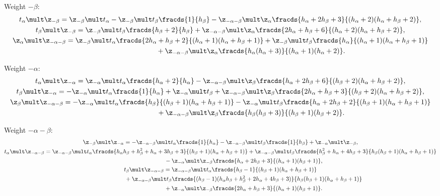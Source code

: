 \documentclass[pdftex]{sigma}
\def\a{\alpha}\def\Ar{{\rm A}}\def\Ab{\bar{\rm A}}\def\b{\beta}\def\bb{\mathfrak{b}}
\numberwithin{equation}{section}
\begin{document}
Weight $-\beta$:
\begin{gather}
 t_\a\mult \z_{-\b} =  \z_{-\b}\mult t_\a - \z_{-\b}\mult t_\b   \fracds{1}{h_\b }-\z_{-\a -\b}\mult\z_\a \fracds{h_\a +2h_\b +3}{(h_\a +2)(h_\a +h_\b +2)} ,\\
  t_\b\mult \z_{-\b}   = \z_{-\b}\mult t_\b  \fracds{h_\b+2}{h_\b }+\z_{-\a -\b}\mult\z_\a \fracds{2h_\a +h_\b +6}{(h_\a +2)(h_\a +h_\b +2)} ,\\
 \nonumber \z_\a\mult \z_{-\a -\b}=\z_{-\b}\mult  t_\a \fracds{2h_\a +h_\b +2}{(h_\a+1)(h_\a +h_\b +1)}+\z_{-\b}\mult t_\b  \fracds{h_\a}{(h_\a +1)(h_\a +h_\b +1)}\\
\phantom{\z_\a\mult \z_{-\a -\b}=}{} + \z_{-\a -\b}\mult\z_\a \fracds{h_\a (h_\a  +3)}{(h_\a +1)(h_\a +2)} .
\end{gather}

Weight $-\alpha$:
\begin{gather}
t_\a\mult \z_{-\a} =\z_{-\a}\mult t_\a  \fracds{h_\a+2}{h_\a }-\z_{-\a -\b}\mult\z_\b \fracds{h_\a +2h_\b +6}{(h_\b +2)(h_\a +h_\b +2)} ,\\
 t_\b\mult \z_{-\a} =-\z_{-\a}\mult t_\a \fracds{1}{h_\a }+\z_{-\a}\mult t_\b +\z_{-\a -\b}\mult\z_\b \fracds{2h_\a +h_\b +3}{(h_\b +2)(h_\a +h_\b +2)} ,\\
\nonumber \z_\b\mult\z_{-\a -\b}=-\z_{-\a}\mult t_\a \fracds{h_\b}{(h_\b +1)(h_\a +h_\b +1)}-\z_{-\a}\mult t_\b \fracds{h_\a +2h_\b +2}{(h_\b +1)(h_\a +h_\b +1)}\\
\phantom{\z_\b\mult\z_{-\a -\b}=}{} +  \z_{-\a -\b}\mult\z_\b  \fracds{h_\b(h_\b +3)}{(h_\b +1)(h_\b +2)} .
\end{gather}

Weight $-\alpha-\beta$:
\begin{gather}
 \z_{-\b}\mult\z_{-\a}=-\z_{-\a -\b}\mult t_\a \fracds{1}{h_\a}- \z_{-\a -\b}\mult t_\b \fracds{1}{h_\b}+\z_{-\a}\mult\z_{-\b} ,\\
 \nonumber t_\a\mult\z_{-\a -\b} =\z_{-\a -\b}\mult t_\a \fracds{h_\a h_\b+h_\b^2+h_\a+3h_\b+3}{(h_\b +1)(h_\a +h_\b +1)}
 +  \z_{-\a -\b}\mult t_\b \fracds{h_\b^2+h_\a+4h_\b+3}{h_\b(h_\b +1)(h_\a+h_\b+1)}\\
 \phantom{t_\a\mult\z_{-\a -\b} =}{} -  \z_{-\a}\mult\z_{-\b} \fracds{h_\a +2h_\b +3}{(h_\a +1)(h_\b +1)} ,\\
 \nonumber t_\b\mult\z_{-\a -\b} = \z_{-\a -\b}\mult t_\a \fracds{h_\b-1}{(h_\b +1)(h_\a +h_\b +1)}\\
\nonumber \phantom{t_\b\mult\z_{-\a -\b} =}{} + \z_{-\a -\b}\mult t_\b \fracds{(h_\b -1)(h_\a h_\b+h_\b^2+2h_\a+4h_\b+3)}{h_\b(h_\b +1)(h_\a +h_\b +1)}\\
\phantom{t_\b\mult\z_{-\a -\b} =}{} + \z_{-\a}\mult\z_{-\b} \fracds{2h_\a +h_\b +3}{(h_\a +1)(h_\b +1)} .
\end{gather}
\end{document}
